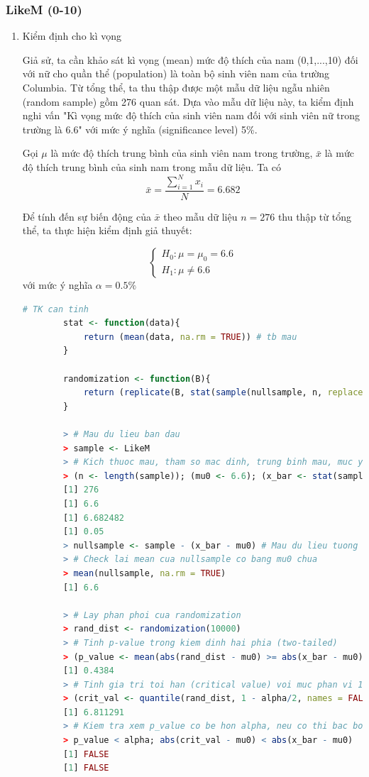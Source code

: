 \documentclass[a4paper,12pt]{article}
\begin{document}
	\subsubsection{LikeM (0-10)}
	\begin{enumerate}[label = \alph*)]
		\item Kiểm định cho kì vọng \label{2a}
		
		Giả sử, ta cần khảo sát kì vọng (mean) mức độ thích của nam (0,1,...,10) đối với nữ cho quần thể (population) là toàn bộ sinh viên nam của trường Columbia. Từ tổng thể, ta thu thập được một mẫu dữ liệu ngẫu nhiên (random sample) gồm 276 quan sát. Dựa vào mẫu dữ liệu này, ta kiểm định nghi vấn "Kì vọng mức độ thích của sinh viên nam đối với sinh viên nữ trong trường là 6.6" với mức ý nghĩa (significance level) 5\%.
	
		Gọi $\mu$ là mức độ thích trung bình của sinh viên nam trong trường, $\bar{x}$ là mức độ thích trung bình của sinh nam trong mẫu dữ liệu. Ta có
			$$\bar{x} = \frac{\sum_{i = 1}^{N}x_i}{N} =  6.682$$
		
		Để tính đến sự biến động của $\bar{x}$ theo mẫu dữ liệu $n = 276$ thu thập từ tổng thể, ta thực hiện kiểm định giả thuyết:
		
		\begin{equation*}
		\begin{cases}
		H_0: \mu = \mu_0 = 6.6\\
		H_1: \mu \neq 6.6
		\end{cases}
		\end{equation*}
		với mức ý nghĩa $\alpha = 0.5\%$
		
		\begin{lstlisting}[language=R]
		# TK can tinh
		stat <- function(data){
			return (mean(data, na.rm = TRUE)) # tb mau
		}
		
		randomization <- function(B){
			return (replicate(B, stat(sample(nullsample, n, replace = TRUE))))
		}
		
		> # Mau du lieu ban dau
		> sample <- LikeM
		> # Kich thuoc mau, tham so mac dinh, trung binh mau, muc y nghia
		> (n <- length(sample)); (mu0 <- 6.6); (x_bar <- stat(sample)); (alpha <- 0.05)
		[1] 276
		[1] 6.6
		[1] 6.682482
		[1] 0.05
		> nullsample <- sample - (x_bar - mu0) # Mau du lieu tuong ung voi H0
		> # Check lai mean cua nullsample co bang mu0 chua
		> mean(nullsample, na.rm = TRUE)
		[1] 6.6
		 
		> # Lay phan phoi cua randomization
		> rand_dist <- randomization(10000)
		> # Tinh p-value trong kiem dinh hai phia (two-tailed)
		> (p_value <- mean(abs(rand_dist - mu0) >= abs(x_bar - mu0)))
		[1] 0.4384
		> # Tinh gia tri toi han (critical value) voi muc phan vi 1-alpha/2
		> (crit_val <- quantile(rand_dist, 1 - alpha/2, names = FALSE))
		[1] 6.811291
		> # Kiem tra xem p_value co be hon alpha, neu co thi bac bo H0
		> p_value < alpha; abs(crit_val - mu0) < abs(x_bar - mu0)
		[1] FALSE
		[1] FALSE
		\end{lstlisting}
		

\end{enumerate}
\end{document}
